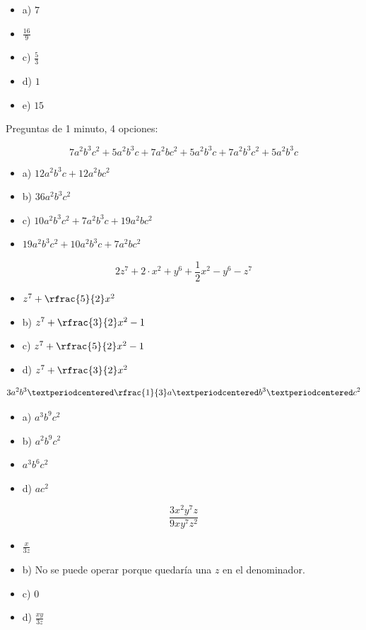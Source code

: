 \begin{itemize}
	\item a) $7$
	\item {} $\frac{16}{9}$
	\item c) $\frac{5}{3}$
	\item d) $1$
	\item e) $15$
\end{itemize}


\newbloq Preguntas de 1 minuto, 4 opciones:

\[
	7a^2b^3c^2 + 5a^2b^3c  + 7a^2bc^2 + 5a^2b^3c + 7a^2b^3c^2 + 5a^2b^3c 
\]

\begin{itemize}
	\item a) $12a^2b^3c + 12a^2bc^2$
	\item b) $36a^2b^3c^2$
	\item c) $10a^2b^3c^2 + 7a^2b^3c + 19a^2bc^2$
	\item {} $19a^2b^3c^2 + 10a^2b^3c + 7a^2bc^2$
\end{itemize}

\[
	2z^7 + 2·x^2 + y^6 + \frac{1}{2}x^2 - y^6 -z^7
\]

\begin{itemize}
	\item {} $z^7 + \rfrac{5}{2}x^2$
	\item b) $z^7 + \rfrac{3}{2}x^2 - 1$
	\item c) $z^7 + \rfrac{5}{2}x^2 - 1$
	\item d) $z^7 + \rfrac{3}{2}x^2$
\end{itemize}


\[
	3a^2b^3 · \rfrac{1}{3}a·b^3·c^2
\]

\begin{itemize}
	\item a) $a^3b^9c^2$
	\item b) $a^2b^9c^2$
	\item {} $a^3b^6c^2$
	\item d) $ac^2$
\end{itemize}


\[
	\frac{3x^2y^7z}{9xy^7z^2}
\]

\begin{itemize}
	\item {} $\frac{x}{3z}$
	\item b) No se puede operar porque quedaría una $z$ en el denominador.
	\item c) $0$
	\item d) $\frac{xy}{3z}$
\end{itemize}


